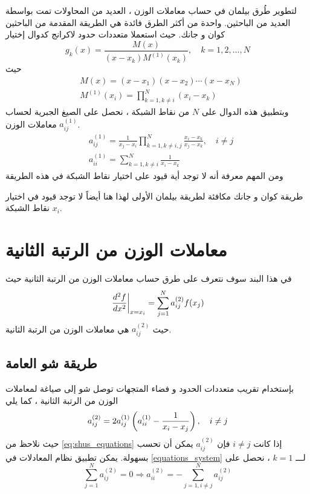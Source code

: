 لتطوير طُرق بيلمان في حساب معاملات الوزن ، العديد من المحاولات تمت بواسطة العديد من الباحثين. واحدة من أكثر الطرق فائدة هي الطريقة المقدمة من الباحثين كوان و جانك. حيث استعملا متعددات حدود لاكرانج كدوال إختيار
\begin{equation}
	\label{test_function_3}
	g_k(x)=\frac{M(x)}{(x-x_k)M^{(1)}(x_k)},\quad k=1,2,\dots,N
\end{equation}
حيث
\begin{align*}
	&M(x)=(x-x_1)(x-x_2)\cdots(x-x_N)\\
	&M^{(1)}(x_i)=\prod_{k=1,k\neq i}^{N}(x_i-x_k)
\end{align*}
وبتطبيق هذه الدوال على $N$ من نقاط الشبكة ، نحصل على الصيغ الجبرية لحساب معاملات الوزن $a_{ij}^{(1)}$.
\begin{equation}
	\label{quan_chang_equations}
	\begin{aligned}
		& a_{ij}^{(1)}=\frac{1}{x_j-x_i}\prod_{k=1,k\neq i,j}^{N}\frac{x_i-x_k}{x_j-x_k},\quad i\neq j \\
		& a_{ii}^{(1)}=\sum_{k=1,k\neq i}^{N}\frac{1}{x_i-x_k}
	\end{aligned}
\end{equation}
ومن المهم معرفة أنه لا توجد أية قيود على اختيار نقاط الشبكة في هذه الطريقة

\begin{note}
	طريقة كوان و جانك مكافئة لطريقة بيلمان الأولى لهذا هنا أيضاً لا توجد قيود في اختيار نقاط الشبكة $x_i$.
\end{note}

\section[معاملات الوزن من الرتبة الثانية]{معاملات الوزن من الرتبة الثانية }

في هذا البند سوف نتعرف على طرق حساب معاملات الوزن من الرتبة الثانية حيث
\begin{equation}
	\label{eq:DQM_formula_order2}
	\left.\frac{d^2f}{dx^2}\right|_{x=x_i}=\sum_{j=1}^{N}a_{ij}^{(2)}f(x_j)
\end{equation}
حيث $a_{ij}^{(2)}$ هي معاملات الوزن من الرتبة الثانية.

\subsection[طريقة شو العامة]{طريقة شو العامة \cite{chang_shu} }
بإستخدام تقريب متعددات الحدود و فضاء المتجهات توصل شو إلى صياغة لمعاملات الوزن من الرتبة الثانية ، كما يلي
\begin{equation}
	\label{eq:shus_equations}
	a_{ij}^{(2)}=2a_{ij}^{(1)}\left(a_{ii}^{(1)}-\frac{1}{x_i-x_j}\right),\quad i\not=j
\end{equation}
حيث نلاحظ من \eqref{eq:shus_equations} إذا كانت $i\neq j$ فإن $a_{ij}^{(2)}$ يمكن أن تحسب بسهولة. يمكن تطبيق نظام المعادلات في \eqref{equations_system} لـــ $k=1$ ، نحصل على
\[
\sum_{j=1}^{N}a_{ij}^{(2)}=0\Longrightarrow a_{ii}^{(2)}=-\sum_{j=1,i\neq j}^{N}a_{ij}^{(2)}
\]


